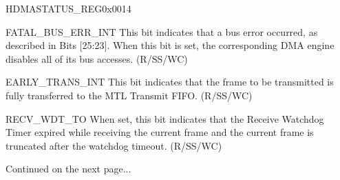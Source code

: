 \begin{register}{H}{DMASTATUS\_REG}{0x0014}
\begin{regdesc}
\begin{reglist}
\item [FATAL\_BUS\_ERR\_INT]This bit indicates that a bus error occurred, as described in Bits [25:23]. When this bit is set, the corresponding DMA engine disables all of its bus accesses. (R/SS/WC)
\item [EARLY\_TRANS\_INT]This bit indicates that the frame to be transmitted is fully transferred to the MTL Transmit FIFO. (R/SS/WC)
\item [RECV\_WDT\_TO]When set, this bit indicates that the Receive Watchdog Timer expired while receiving the current frame and the current frame is truncated after the watchdog timeout. (R/SS/WC)
\item [Continued on the next page...]
\end{reglist}\end{regdesc}
\end{register}

